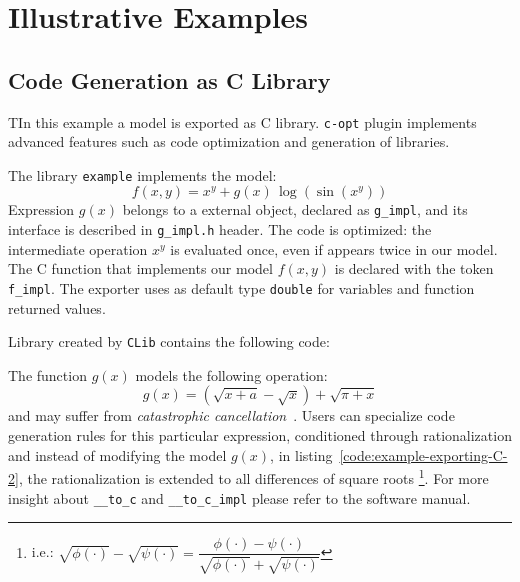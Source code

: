 
\section{Illustrative Examples}
\label{sec:examples}

\subsection{Code Generation as C Library}
TIn this example a model is exported as C library. \texttt{c-opt} plugin implements advanced features such as code optimization and generation of libraries.

The library \texttt{example} implements the model:
\begin{equation}
f(x, y) = x^y + g(x)\, \log(\sin(x^y))
\end{equation}
Expression $g(x)$ belongs to a external object, declared as \texttt{g\_impl}, and its interface is described in \texttt{g\_impl.h} header. The code is optimized: the intermediate operation $x^y$ is evaluated once, even if appears twice in our model. The C function that implements our model $f(x,y)$ is declared with the token \texttt{f\_impl}. The exporter uses as default type \texttt{double} for variables and function returned values.


Library created by \texttt{CLib} contains the following code:

\noindent%
  \begin{minipage}{.5\textwidth}
    
  \end{minipage}\hfill
  \begin{minipage}{.5\textwidth}
    
  \end{minipage}

The function $g(x)$ models the following operation:
\begin{equation}
g(x) = (\sqrt{x + a} - \sqrt{x}) + \sqrt{\pi + x}
\end{equation}
and may suffer from \emph{catastrophic cancellation}~\cite{higham2002accuracy}. Users can specialize code generation rules for this particular expression, conditioned through rationalization and instead of modifying the model $g(x)$, in listing~\ref{code:example-exporting-C-2}, the rationalization is extended to all differences of square roots
\footnote{i.e.:
$\sqrt{\phi(\cdot)} - \sqrt{\psi(\cdot)} =
\dfrac{\phi(\cdot) - \psi(\cdot)}{\sqrt{\phi(\cdot)} + \sqrt{\psi(\cdot)}}$}.
For more insight about \texttt{\_\_to\_c} and \texttt{\_\_to\_c\_impl} please refer to the software manual.

